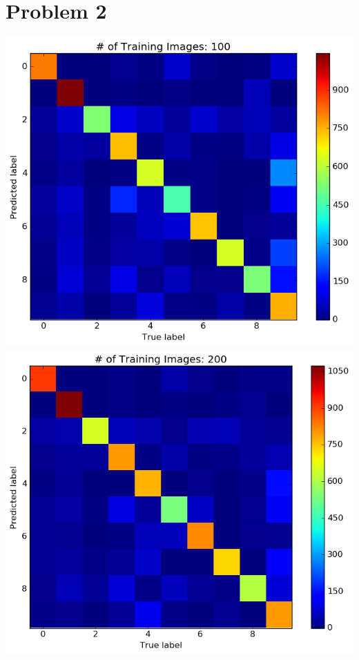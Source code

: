 \documentclass{article}
\begin{document}
\section*{Problem 2}
\begin{center}
  \includegraphics[scale=0.4]{100}
  \includegraphics[scale=0.4]{200}\\

\end{center}
\end{document}
